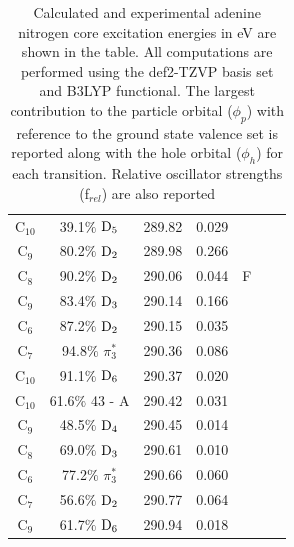 \documentclass[12pt]{article}
\begin{document}
\begin{table}
\begin{tabular}{c@{\hskip 0.22in}c@{\hskip 0.22in}c@{\hskip 0.22in}c@{\hskip 0.52in}c@{\hskip 0.22in}c@{\hskip 0.22in}c}
    C$_{10}$
 &   39.1$\%$ $\rm D_5$  & 289.82 & 0.029 & \multirow{5}{*}{F} \\
    C$_9$
 &   80.2$\%$ $\rm D_2$  & 289.98 & 0.266 \\
    C$_8$
 &   90.2$\%$ $\rm D_2$  & 290.06 & 0.044 \\
    C$_9$
 &   83.4$\%$ $\rm D_3$  & 290.14 & 0.166 \\
    C$_6$
 &   87.2$\%$ $\rm D_2$  & 290.15 & 0.035 
 \vspace{0.1in}\\
    C$_7$
 &   94.8$\%$ $\pi_3^*$  & 290.36 & 0.086 \\
    C$_{10}$
 &   91.1$\%$ $\rm D_6$  & 290.37 & 0.020 \\
    C$_{10}$
 &   61.6$\%$ 43 - A  & 290.42 & 0.031 \\
    C$_9$
 &   48.5$\%$ $\rm D_4$  & 290.45 & 0.014 \\
    C$_8$
 &   69.0$\%$ $\rm D_3$  & 290.61 & 0.010 \\
    C$_6$
 &   77.2$\%$ $\pi_3^*$  & 290.66 & 0.060 \\
    C$_7$
 &   56.6$\%$ $\rm D_2$  & 290.77 & 0.064 \\
    C$_9$
 &   61.7$\%$ $\rm D_6$  & 290.94 & 0.018 \\
   \end{tabular}
      \caption{Calculated and experimental adenine nitrogen core excitation energies in eV are shown in the table. All computations are performed using the def2-TZVP basis set and B3LYP functional. The largest contribution to the particle orbital ($\phi_p$) with reference to the ground state valence set is reported along with the hole orbital ($\phi_h$) for each transition. Relative oscillator strengths (f$_{rel}$) are also reported}
   \label{table: adenine_k_nitrogen}
   \end{table}
\end{document}
